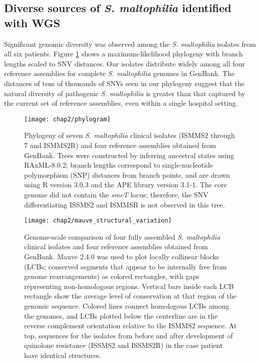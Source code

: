 \subsection{Diverse sources of \emph{S. maltophilia} identified with WGS}

Significant genomic diversity was observed among the \emph{S. maltophilia} isolates from all six patients. Figure \ref{fig:steno_phylo} shows a maximum-likelihood phylogeny with branch lengths scaled to SNV distances. Our isolates distribute widely among all four reference assemblies for complete \emph{S. maltophilia} genomes in GenBank. The distances of tens of thousands of SNVs seen in our phylogeny suggest that the natural diversity of pathogenic \emph{S. maltophilia} is greater than that captured by the current set of reference assemblies, even within a single hospital setting. 

\begin{figure}[htb]
  \texttt{[image: chap2/phylogram]}               
  \caption[Phylogeny of seven \emph{S. maltophilia} clinical isolates]{Phylogeny of seven \emph{S. maltophilia} clinical isolates (ISMMS2 through 7 and ISMMS2R) and four reference assemblies obtained from GenBank. Trees were constructed by inferring ancestral states using RAxML-8.0.2; branch lengths correspond to single-nucleotide polymorphism (SNP) distances from branch points, and are drawn using R version 3.0.3 and the APE library version 3.1-1. The core genome did not contain the \emph{smeT} locus; therefore, the SNV differentiating ISSMS2 and ISMMSR is not observed in this tree.}
  \label{fig:steno_phylo}
\end{figure}

\begin{figure}[htb]
  \texttt{[image: chap2/mauve\_structural\_variation]}               
  \caption[Genome-scale comparison of four clinical isolates and four reference assemblies]{Genome-scale comparison of four fully assembled \emph{S. maltophilia} clinical isolates and four reference assemblies obtained from GenBank. Mauve 2.4.0 was used to plot locally collinear blocks (LCBs; conserved segments that appear to be internally free from genome rearrangements) as colored rectangles, with gaps representing non-homologous regions. Vertical bars inside each LCB rectangle show the average level of conservation at that region of the genomic sequence. Colored lines connect homologous LCBs among the genomes, and LCBs plotted below the centerline are in the reverse complement orientation relative to the ISMMS2 sequence. At top, sequences for the isolates from before and after development of quinolone resistance (ISSMS2 and ISSMS2R) in the case patient have identical structures.}
  \label{fig:mauve}
\end{figure}

